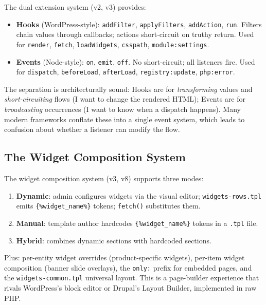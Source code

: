 \documentclass[11pt,a4paper]{article}
\begin{document}
\begin{goodbox}
The dual extension system (v2, v3) provides:

\begin{itemize}[leftmargin=1.6em,itemsep=2pt]
  \item \textbf{Hooks} (WordPress-style): \texttt{addFilter},
        \texttt{applyFilters}, \texttt{addAction}, \texttt{run}.
        Filters chain values through callbacks; actions short-circuit
        on truthy return. Used for \texttt{render}, \texttt{fetch},
        \texttt{loadWidgets}, \texttt{csspath}, \texttt{module:settings}.
  \item \textbf{Events} (Node-style): \texttt{on}, \texttt{emit},
        \texttt{off}. No short-circuit; all listeners fire. Used for
        \texttt{dispatch}, \texttt{beforeLoad}, \texttt{afterLoad},
        \texttt{registry:update}, \texttt{php:error}.
\end{itemize}

The separation is architecturally sound: Hooks are for
\emph{transforming} values and \emph{short-circuiting} flows (I want
to change the rendered HTML); Events are for \emph{broadcasting}
occurrences (I want to know when a dispatch happens). Many modern
frameworks conflate these into a single event system, which leads to
confusion about whether a listener can modify the flow.
\end{goodbox}

\subsection{The Widget Composition System}

\begin{goodbox}
The widget composition system (v3, v8) supports three modes:

\begin{enumerate}[leftmargin=1.6em,itemsep=2pt]
  \item \textbf{Dynamic}: admin configures widgets via the visual
        editor; \texttt{widgets-rows.tpl} emits
        \texttt{\{\%widget\_name\%\}} tokens; \texttt{fetch()}
        substitutes them.
  \item \textbf{Manual}: template author hardcodes
        \texttt{\{\%widget\_name\%\}} tokens in a \texttt{.tpl} file.
  \item \textbf{Hybrid}: combines dynamic sections with hardcoded
        sections.
\end{enumerate}

Plus: per-entity widget overrides (product-specific widgets),
per-item widget composition (banner slide overlays), the
\texttt{only:} prefix for embedded pages, and the
\texttt{widgets-common.tpl} universal layout. This is a page-builder
experience that rivals WordPress's block editor or Drupal's Layout
Builder, implemented in raw PHP.
\end{goodbox}
\end{document}
